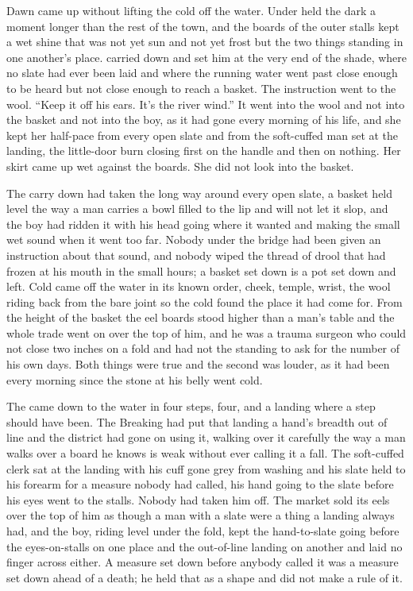 
Dawn came up  without lifting the cold off the water. Under   held the dark a moment longer than the rest of the town, and the boards of the outer stalls kept a wet shine that was not yet sun and not yet frost but the two things standing in one another's place.  carried  down and set him at the very end of the shade, where no slate had ever been laid and where the running water went past close enough to be heard but not close enough to reach a basket. The instruction went to the wool. “Keep it off his ears. It's the river wind.” It went into the wool and not into the basket and not into the boy, as it had gone every morning of his life, and she kept her half-pace from every open slate and from the soft-cuffed man set at the landing, the little-door burn closing first on the handle and then on nothing. Her skirt came up wet against the boards. She did not look into the basket.

The carry down had taken the long way around every open slate, a basket held level the way a man carries a bowl filled to the lip and will not let it slop, and the boy had ridden it with his head going where it wanted and making the small wet sound when it went too far. Nobody under the bridge had been given an instruction about that sound, and nobody wiped the thread of drool that had frozen at his mouth in the small hours; a basket set down is a pot set down and left. Cold came off the water in its known order, cheek, temple, wrist, the wool riding back from the bare joint so the cold found the place it had come for. From the height of the basket the eel boards stood higher than a man's table and the whole trade went on over the top of him, and he was a trauma surgeon who could not close two inches on a fold and had not the standing to ask for the number of his own days. Both things were true and the second was louder, as it had been every morning since the stone at his belly went cold.

The  came down to the water in four steps, four, and a landing where a step should have been. The Breaking had put that landing a hand's breadth out of line and the district had gone on using it, walking over it carefully the way a man walks over a board he knows is weak without ever calling it a fall. The soft-cuffed clerk sat at the landing with his cuff gone grey from washing and his slate held to his forearm for a measure nobody had called, his hand going to the slate before his eyes went to the stalls. Nobody had taken him off. The market sold its eels over the top of him as though a man with a slate were a thing a landing always had, and the boy, riding level under the fold, kept the hand-to-slate going before the eyes-on-stalls on one place and the out-of-line landing on another and laid no finger across either. A measure set down before anybody called it was a measure set down ahead of a death; he held that as a shape and did not make a rule of it.

